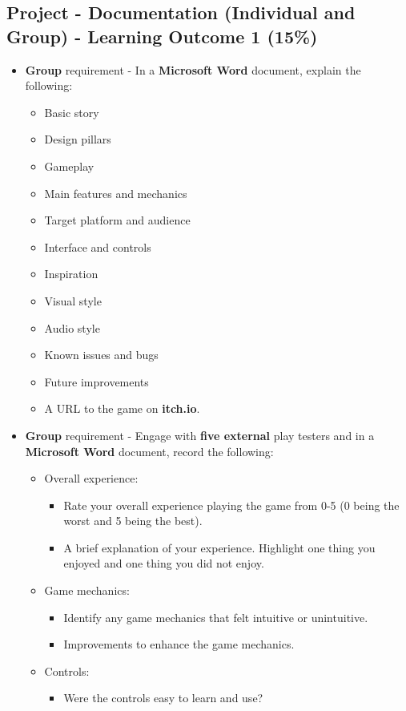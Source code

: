\documentclass{article}
\begin{document}
\subsection*{Project - Documentation (Individual and Group) - Learning Outcome 1 (15\%)}
\begin{itemize}
	\item \textbf{Group} requirement - In a \textbf{Microsoft Word} document, explain the following:
	\begin{itemize}
		\item Basic story
		\item Design pillars
		\item Gameplay
		\item Main features and mechanics
		\item Target platform and audience
		\item Interface and controls
		\item Inspiration
		\item Visual style
		\item Audio style
		\item Known issues and bugs
		\item Future improvements
		\item A URL to the game on \textbf{itch.io}.
	\end{itemize}
	\item \textbf{Group} requirement - Engage with \textbf{five external} play testers and in a \textbf{Microsoft Word} document, record the following:
	\begin{itemize}
		\item Overall experience:
		\begin{itemize}
			\item Rate your overall experience playing the game from 0-5 (0 being the worst and 5 being the best).
			\item A brief explanation of your experience. Highlight one thing you enjoyed and one thing you did not enjoy.
		\end{itemize}
		\item Game mechanics:
		\begin{itemize}
			\item Identify any game mechanics that felt intuitive or unintuitive.
			\item Improvements to enhance the game mechanics.
		\end{itemize}
		\item Controls:
		\begin{itemize}
			\item Were the controls easy to learn and use?

\end{itemize}
\end{itemize}
\end{itemize}
\end{document}
